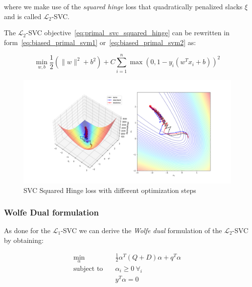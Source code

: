 where we make use of the \emph{squared hinge} loss that quadratically penalized slacks $\xi$ and is called $\mathcal{L}_2$-SVC.

The $\mathcal{L}_2$-SVC objective~\eqref{eq:primal_svc_squared_hinge} can be rewritten in form~\eqref{eq:biased_primal_svm1} or~\eqref{eq:biased_primal_svm2} as:

\begin{equation} \label{eq:biased_primal_svc_squared_hinge}
    \min_{w,b} \frac{1}{2} (\| w \|^2 + b^2) + C \sum_{i=1}^n \max(0, 1 - y_i (w^T x_i + b))^2
\end{equation}

\begin{figure}[h!]
	\centering
  	\includegraphics[scale=0.4]{img/svc_squared_hinge_loss}
  	\caption{SVC Squared Hinge loss with different optimization steps}
  	\label{fig:svc_squared_hinge_loss}
\end{figure}

\subsubsection{Wolfe Dual formulation}

As done for the $\mathcal{L}_1$-SVC we can derive the \emph{Wolfe dual} formulation of the $\mathcal{L}_2$-SVC by obtaining:

\begin{equation} \label{eq:wolfe_dual_svc_squared_hinge}
    \begin{aligned}
        \min_{\alpha} \quad & \frac{1}{2}\alpha^T (Q + D)\alpha+q^T\alpha \\
            \text{subject to} \quad & \alpha_i\geq 0 \ \forall_i \\ & y^T\alpha=0
    \end{aligned}
\end{equation}

